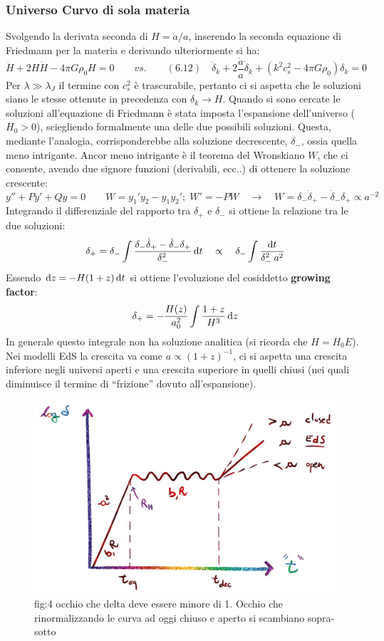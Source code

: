 \subsubsection{Universo Curvo di sola materia}
Svolgendo la derivata seconda di $H=\dot{a} / a$, inserendo la seconda equazione di Friedmann per la materia e derivando ulteriormente si ha:
\begin{equation*}
    \ddot{H}+2H\dot{H}-4\pi G \rho_0 H = 0 \qquad vs. \qquad (6.12) \quad \ddot{\delta}_k + 2 \frac{\dot{a}}{a}\dot{\delta}_k + \left( k^2 c_s^2 -4\pi G \rho_0\right) \delta_k  =0
\end{equation*}
Per $\lambda \gg \lambda_J$ il termine con $c_s^2$ è trascurabile, pertanto ci si aspetta che le soluzioni siano le stesse ottenute in precedenza con $\delta_k \rightarrow H$. Quando si sono cercate le soluzioni all'equazione di Friedmann è stata imposta l'espansione dell'universo ($H_0 > 0$), sciegliendo formalmente una delle due possibili soluzioni. Questa, mediante l'analogia, corrisponderebbe alla soluzione decrescente, $\delta_-$, ossia quella meno intrigante. Ancor meno intrigante è il teorema del Wronskiano $W$, che ci consente, avendo due signore funzioni (derivabili, ecc..) di ottenere la soluzione crescente:
$$
y''+Py'+Qy=0 \qquad W=y_1'y_2 - y_1y_2'; \; W'=-PW \quad \rightarrow \quad W=\delta_-\dot{\delta}_+ - \dot{\delta}_-\delta_+ \propto a^{-2}
$$
Integrando il differenziale del rapporto tra $\delta_+$ e $\delta_-$ si ottiene la relazione tra le due soluzioni:
\begin{equation*}
    \delta_+ = \delta_- \int \frac{\delta_-\dot{\delta}_+ - \dot{\delta}_-\delta_+}{\delta_-^2}\operatorname{d}\!{t}\quad\propto\quad \delta_- \int \frac{\operatorname{d}\!{t}}{\delta_-^2\: a^2}
\end{equation*}
Essendo $\operatorname{d}\!{z}=-H(1+z)\operatorname{d}\!{t}$ si ottiene l'evoluzione del cosiddetto \textbf{growing factor}:
\begin{equation}
    \delta_+ = -\frac{H(z)}{a_0^2}\int \frac{1+z}{H^3}\operatorname{d}\!{z}
\end{equation}
In generale questo integrale non ha soluzione analitica (si ricorda che $H=H_0 E$). Nei modelli EdS la crescita va come $a\propto (1+z)^{-1}$, ci si aspetta una crescita inferiore negli universi aperti e una crescita superiore in quelli chiusi (nei quali diminuisce il termine di ``frizione'' dovuto all'espansione).

\begin{figure}[H]
    \centering
    \includegraphics[width=.55 \textwidth]{Pictures/6/growingfactor.jpg}
    \caption{fig:4 occhio che delta deve essere minore di 1. Occhio che rinormalizzando le curva ad oggi chiuso e aperto si scambiano sopra-sotto}
\end{figure}

